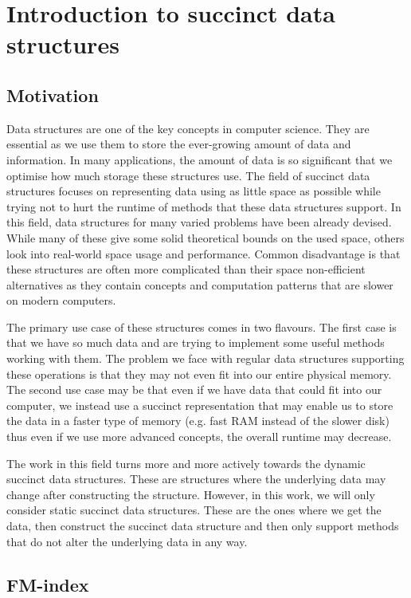 \chapter{Introduction to succinct data structures}
\label{kap:kap1}

\section{Motivation}
Data structures are one of the key concepts in computer science. They are essential
as we use them to store the ever-growing amount of data and information. In many
applications, the amount of data is so significant that we optimise how much storage
these structures use. The field of succinct data structures focuses on representing
data using as little space as possible while trying not to hurt the runtime of methods
that these data structures support. In this field, data structures for many varied problems
have been already devised. While many of these give some solid theoretical bounds on
the used space, others look into real-world space usage and performance. Common
disadvantage is that these structures are often more complicated than their space
non-efficient alternatives as they contain concepts and computation patterns that are
slower on modern computers.

The primary use case of these structures comes in two flavours. The first case is
that we have so much data and are trying to implement some useful methods working
with them. The problem we face with regular data structures supporting these
operations is that they may not even fit into our entire physical memory. The
second use case may be that even if we have data that could fit into our computer,
we instead use a succinct representation that may enable us to store the data in
a faster type of memory (e.g. fast RAM instead of the slower disk) thus even if we
use more advanced concepts, the overall runtime may decrease.

The work in this field turns more and more actively towards the dynamic succinct
data structures. These are structures where the underlying data may change after
constructing the structure. However, in this work, we will only consider static
succinct data structures. These are the ones where we get the data, then construct
the succinct data structure and then only support methods that do not alter the
underlying data in any way.  

\section{FM-index}

